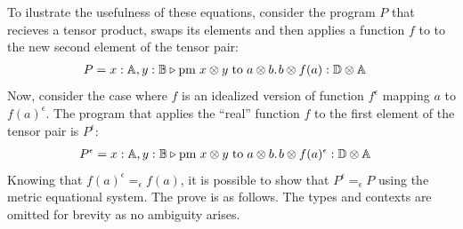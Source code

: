 To ilustrate the usefulness of these equations, consider the program $P$ that recieves a tensor product, swaps its elements and then applies a function $f$ to to the new second element of the tensor  pair:
\begin{equation*}
\begin{split}
& P = x : \mathbb{A},  y : \mathbb{B} \triangleright \text{pm} \hspace{3 pt} x \otimes y\hspace{3 pt} \text{to} \hspace{3 pt} a \otimes b. \hspace{1pt} b \otimes f(a) : \mathbb{D} \otimes \mathbb{A} &
\end{split}
\end{equation*}
Now, consider the case where $f$ is an idealized version of function $f^{\epsilon}$ mapping $a$ to $f(a)^{\epsilon}$. The program that applies the ``real'' function $f$ to the first element of the tensor pair is $P^{\epsilon}$:
\begin{equation*}
  \begin{split}
  & P^{\epsilon} = x : \mathbb{A},  y : \mathbb{B} \triangleright \text{pm} \hspace{3 pt} x \otimes y\hspace{3 pt} \text{to} \hspace{3 pt} a \otimes b. \hspace{1pt} b \otimes f(a)^{\epsilon}  : \mathbb{D} \otimes \mathbb{A} &
  \end{split}
  \end{equation*}
Knowing that $f(a)^{\epsilon} =_{\epsilon} f(a)$, it is possible to show that $P^{\epsilon} =_{\epsilon} P $ using the metric equational system. The prove is as follows. The types and contexts are omitted for brevity as no ambiguity arises.
